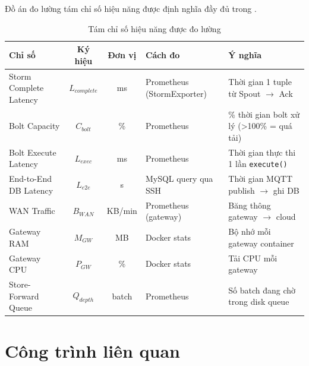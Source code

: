 \documentclass[13pt,a4paper]{report}
\newcommand{\code}[1]{\texttt{\small #1}}
\begin{document}
Đồ án đo lường tám chỉ số hiệu năng được định nghĩa đầy đủ trong
.

\begin{table}[H]
\centering
\caption{Tám chỉ số hiệu năng được đo lường}
\label{tab:chiso}
\small
\renewcommand{\arraystretch}{1.25}
\begin{tabular}{p{} c c p{} p{}}
\toprule
\textbf{Chỉ số} & \textbf{Ký hiệu} & \textbf{Đơn vị} & \textbf{Cách đo} & \textbf{Ý nghĩa} \\
\midrule
Storm Complete Latency & $L_{complete}$ & ms    & Prometheus (StormExporter) & Thời gian 1 tuple từ Spout $\to$ Ack \\
Bolt Capacity          & $C_{bolt}$     & \%    & Prometheus                 & \% thời gian bolt xử lý (\textgreater 100\% = quá tải) \\
Bolt Execute Latency   & $L_{exec}$     & ms    & Prometheus                 & Thời gian thực thi 1 lần \code{execute()} \\
End-to-End DB Latency  & $L_{e2e}$      & s     & MySQL query qua SSH        & Thời gian MQTT publish $\to$ ghi DB \\
WAN Traffic            & $B_{WAN}$      & KB/min& Prometheus (gateway)       & Băng thông gateway $\to$ cloud \\
Gateway RAM            & $M_{GW}$       & MB    & Docker stats               & Bộ nhớ mỗi gateway container \\
Gateway CPU            & $P_{GW}$       & \%    & Docker stats               & Tải CPU mỗi gateway \\
Store-Forward Queue    & $Q_{depth}$    & batch & Prometheus                 & Số batch đang chờ trong disk queue \\
\bottomrule
\end{tabular}
\renewcommand{\arraystretch}{1.0}
\end{table}

\section{Công trình liên quan}
\end{document}
